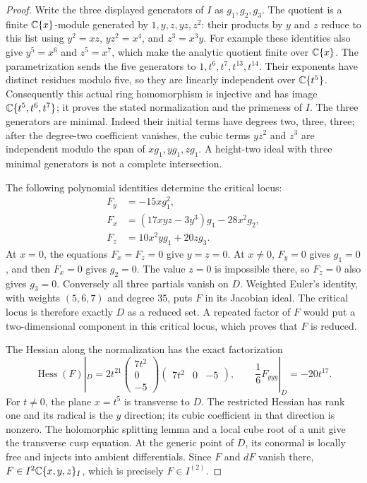 \begin{proof}
Write the three displayed generators of $I$ as $g_1,g_2,g_3$.
The quotient is a finite $\mathbb C\{x\}$-module generated by
$1,y,z,yz,z^2$: their products by $y$ and $z$ reduce to this list
using $y^2=xz$, $yz^2=x^4$, and $z^3=x^3y$.
For example these identities also give $y^5=x^6$ and $z^5=x^7$,
which make the analytic quotient finite over $\mathbb C\{x\}$.
The parametrization sends the five generators to
$1,t^6,t^7,t^{13},t^{14}$. Their exponents have distinct residues
modulo five, so they are linearly independent over $\mathbb C\{t^5\}$.
Consequently this actual ring homomorphism is injective and has
image $\mathbb C\{t^5,t^6,t^7\}$; it proves the stated normalization and
the primeness of $I$. The three generators are minimal. Indeed their
initial terms have degrees two, three, three; after the degree-two
coefficient vanishes, the cubic terms $yz^2$ and $z^3$ are independent
modulo the span of $xg_1,yg_1,zg_1$. A height-two ideal with three
minimal generators is not a complete intersection.

The following polynomial identities determine the critical locus:
\[
 \begin{aligned}
 F_y&=-15xg_1^2,\\
 F_x&=(17xyz-3y^3)g_1-28x^2g_2,\\
 F_z&=10x^2yg_1+20zg_3.
 \end{aligned}                                                   \tag{A.NL.3}
\]
At $x=0$, the equations $F_x=F_z=0$ give $y=z=0$.
At $x\ne0$, $F_y=0$ gives $g_1=0$, and then $F_x=0$
gives $g_2=0$. The value $z=0$ is impossible there, so $F_z=0$
also gives $g_3=0$. Conversely all three partials vanish on $D$.
Weighted Euler's identity, with weights $(5,6,7)$ and degree $35$,
puts $F$ in its Jacobian ideal. The critical locus is therefore
exactly $D$ as a reduced set. A repeated factor of $F$ would put
a two-dimensional component in this critical locus, which proves
that $F$ is reduced.

The Hessian along the normalization has the exact factorization
\[
 \operatorname{Hess}(F)|_D
 =2t^{21}
 \begin{pmatrix}7t^2\\0\\-5\end{pmatrix}
 \begin{pmatrix}7t^2&0&-5\end{pmatrix},
 \qquad \frac{1}{6}F_{yyy}|_D=-20t^{17}.                       \tag{A.NL.4}
\]
For $t\ne0$, the plane $x=t^5$ is transverse to $D$.
The restricted Hessian has rank one and its radical is the
$y$ direction; its cubic coefficient in that direction is nonzero.
The holomorphic splitting lemma and a local cube root of a unit
give the transverse cusp equation. At the generic point of $D$,
its conormal is locally free and injects into ambient differentials.
Since $F$ and $dF$ vanish there, $F\in I^2\mathbb C\{x,y,z\}_I$,
which is precisely $F\in I^{(2)}$.


\end{proof}

